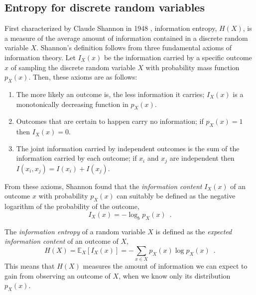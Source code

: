 \subsection{Entropy for discrete random variables}
First characterized by Claude Shannon in 1948 \cite{shannon_mathematical_1948}, information entropy, $H(X)$, is a measure of the average amount of information contained in a discrete random variable $X$. Shannon's definition follows from three fundamental axioms of information theory. Let $I_X(x)$ be the information carried by a specific outcome $x$ of sampling the discrete random variable $X$ with probability mass function $p_X(x)$. Then, these axioms are as follows:
\begin{enumerate}[label=(\Roman*)]
    \item The more likely an outcome is, the less information it carries; $I_X(x)$ is a monotonically decreasing function in $p_X(x)$.
    \item Outcomes that are certain to happen carry no information; if $p_X(x) = 1$ then $I_X(x) = 0$.
    \item The joint information carried by independent outcomes is the sum of the information carried by each outcome; if $x_i$ and $x_j$ are independent then $I(x_i, x_j) = I(x_i) + I(x_j)$. 
\end{enumerate}

From these axioms, Shannon found that the \emph{information content} $I_X(x)$ of an outcome $x$ with probability $p_X(x)$ can suitably be defined as the negative logarithm of the probability of the outcome,
%
\begin{equation} \label{eq:information-content}
    I_X(x) = -\log_b p_X(x) \enspace .
\end{equation}
%

The \emph{information entropy} of a random variable $X$ is defined as the \emph{expected information content} of an outcome of $X$,
%
\begin{equation} \label{eq:information-entropy}
    H(X) = \mathbb{E}_X\left[I_X(x)\right] = - \sum_{x\in X} p_X(x) \log p_X(x) \enspace .
\end{equation}
%
This means that $H(X)$ measures the amount of information we can expect to gain from observing an outcome of $X$, when we know only its distribution $p_X(x)$. 



